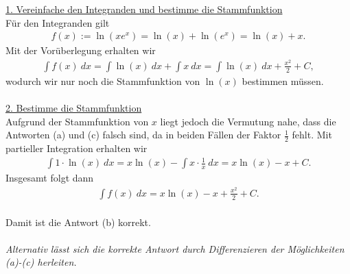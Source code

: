 \underline{1. Vereinfache den Integranden und bestimme die Stammfunktion}\\
Für den Integranden gilt
\begin{align*}
f(x) := \ln(x e^x) = \ln(x) + \ln(e^x) = \ln(x) + x.
\end{align*}
Mit der Vorüberlegung erhalten wir
\begin{align*}
\int f(x) \ dx 
=
\int \ln(x) \ dx + \int x \ dx
= 
\int \ln(x) \ dx + \frac{x^2}{2} + C,
\end{align*}
wodurch wir nur noch die Stammfunktion von $ \ln(x) $ bestimmen müssen.\\
\\
\underline{2. Bestimme die Stammfunktion}\\
Aufgrund der Stammfunktion von $ x $ liegt jedoch die Vermutung nahe, dass die Antworten (a) und (c) falsch sind, da in beiden Fällen der Faktor $ \frac{1}{2} $ fehlt.
Mit partieller Integration erhalten wir
\begin{align*}
\int 1 \cdot \ln(x) \ dx
= x \ln(x) - \int x  \cdot\frac{1}{x} \ dx
= x\ln(x) - x + C.
\end{align*}
Insgesamt folgt dann
\begin{align*}
\int f(x) \ dx = 
x \ln(x) -x + \frac{x^2}{2} + C.
\end{align*}
\ \\
Damit ist die Antwort (b) korrekt.\\
\\
\textit{Alternativ lässt sich die korrekte Antwort durch Differenzieren der Möglichkeiten (a)-(c) herleiten.
}


\newpage

